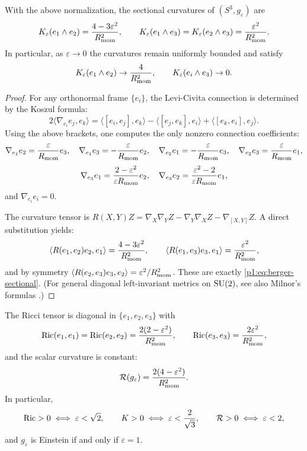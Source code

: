 \documentclass[11pt]{article}
\begin{document}
\begin{theorem}\label{p1:thm:berger-sectional}
With the above normalization, the sectional curvatures of $(S^3,g_\varepsilon)$ are
\begin{equation}\label{p1:eq:berger-sectional}
K_\varepsilon(e_1\wedge e_2)=\frac{4-3\varepsilon^2}{R_{\mathrm{mom}}^2},\qquad
K_\varepsilon(e_1\wedge e_3)=K_\varepsilon(e_2\wedge e_3)=\frac{\varepsilon^2}{R_{\mathrm{mom}}^2}.
\end{equation}
In particular, as $\varepsilon\to0$ the curvatures remain uniformly bounded and satisfy
\[
K_\varepsilon(e_1\wedge e_2)\to \frac{4}{R_{\mathrm{mom}}^2},\qquad
K_\varepsilon(e_i\wedge e_3)\to 0.
\]
\end{theorem}

\begin{proof}
For any orthonormal frame $\{e_i\}$, the Levi-Civita connection is determined by the Koszul formula:
\[
2\langle \nabla_{e_i}e_j,e_k\rangle
=\langle [e_i,e_j],e_k\rangle-\langle [e_j,e_k],e_i\rangle+\langle [e_k,e_i],e_j\rangle.
\]
Using the above brackets, one computes the only nonzero connection coefficients:
\[
\nabla_{e_1}e_2=\frac{\varepsilon}{R_{\mathrm{mom}}}e_3,\quad
\nabla_{e_1}e_3=-\frac{\varepsilon}{R_{\mathrm{mom}}}e_2,\quad
\nabla_{e_2}e_1=-\frac{\varepsilon}{R_{\mathrm{mom}}}e_3,\quad
\nabla_{e_2}e_3=\frac{\varepsilon}{R_{\mathrm{mom}}}e_1,
\]
\[
\nabla_{e_3}e_1=\frac{2-\varepsilon^2}{\varepsilon R_{\mathrm{mom}}}e_2,\quad
\nabla_{e_3}e_2=\frac{\varepsilon^2-2}{\varepsilon R_{\mathrm{mom}}}e_1,
\]
and $\nabla_{e_i}e_i=0$.

The curvature tensor is $R(X,Y)Z=\nabla_X\nabla_Y Z-\nabla_Y\nabla_X Z-\nabla_{[X,Y]}Z$.
A direct substitution yields:
\[
\langle R(e_1,e_2)e_2,e_1\rangle=\frac{4-3\varepsilon^2}{R_{\mathrm{mom}}^2},\qquad
\langle R(e_1,e_3)e_3,e_1\rangle=\frac{\varepsilon^2}{R_{\mathrm{mom}}^2},
\]
and by symmetry $\langle R(e_2,e_3)e_3,e_2\rangle=\varepsilon^2/R_{\mathrm{mom}}^2$.
These are exactly \eqref{p1:eq:berger-sectional}.
(For general diagonal left-invariant metrics on $\mathrm{SU}(2)$, see also Milnor's formulas \cite{Milnor1976}.)
\end{proof}

\begin{corollary}\label{p1:cor:berger-ricci}
The Ricci tensor is diagonal in $\{e_1,e_2,e_3\}$ with
\begin{equation}\label{p1:eq:berger-ricci}
\operatorname{Ric}(e_1,e_1)=\operatorname{Ric}(e_2,e_2)=\frac{2(2-\varepsilon^2)}{R_{\mathrm{mom}}^2},\qquad
\operatorname{Ric}(e_3,e_3)=\frac{2\varepsilon^2}{R_{\mathrm{mom}}^2},
\end{equation}
and the scalar curvature is constant:
\begin{equation}\label{p1:eq:berger-scal}
\mathcal R(g_\varepsilon)=\frac{2(4-\varepsilon^2)}{R_{\mathrm{mom}}^2}.
\end{equation}
In particular,
\[
\operatorname{Ric}>0\iff\varepsilon<\sqrt2,\qquad
K>0\iff\varepsilon<\frac2{\sqrt3},\qquad
\mathcal R>0\iff\varepsilon<2,
\]
and \(g_\varepsilon\) is Einstein if and only if \(\varepsilon=1\).
\end{corollary}
\end{document}
